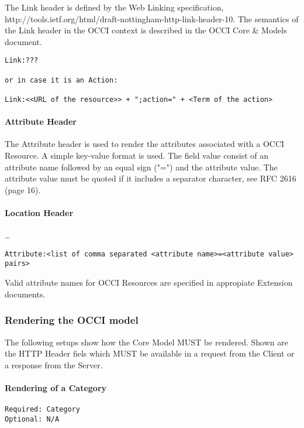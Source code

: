 \documentclass[10pt,a4paper]{article}
\begin{document}
The Link header is defined by the Web Linking specification, http://tools.ietf.org/html/draft-nottingham-http-link-header-10. The semantics of the Link header in the OCCI context is described in the OCCI Core \& Models document.

\begin{verbatim}
Link:???

or in case it is an Action:

Link:<<URL of the resource>> + ";action=" + <Term of the action>
\end{verbatim}

\paragraph{Attribute Header}

The Attribute header is used to render the attributes associated with a OCCI Resource. A simple key-value format is used. The field value consist of an attribute name followed by an equal sign ("=") and the attribute value. The attribute value must be quoted if it includes a separator character, see RFC 2616 (page 16).

\paragraph{Location Header}

\ldots

\begin{verbatim}
Attribute:<list of comma separated <attribute name>=<attribute value> pairs>
\end{verbatim}

Valid attribute names for OCCI Resources are specified in appropiate Extension documents.

\subsubsection{Rendering the OCCI model}

The following setups show how the Core Model MUST be rendered. Shown are the HTTP Header fiels which MUST be available in a request from the Client or a response from the Server.

\paragraph{Rendering of a Category}
\begin{verbatim}
Required: Category
Optional: N/A
\end{verbatim}
\end{document}

